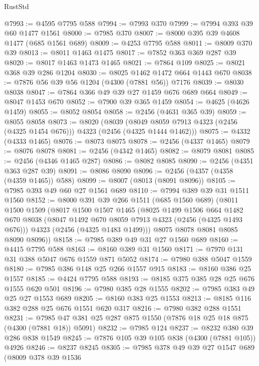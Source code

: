 \begin{lexlean}{RustStd}
\begin{coremodule}
@7993 := @4595 @7795 @588
@7994 := @7993 @370
@7999 := @7994 @393 @39 @60 @1477 @1561
@8000 := @7985 @370
@8007 := @8000 @395 @39 @4608 @1477 (@685 @1561 @689)
@8009 := @4253 @7795 @588
@8011 := @8009 @370 @39
@8013 := @8011 @1463 @1475
@8017 := @7852 @363 @369 @287 @39
@8020 := @8017 @1463 @1473 @1465
@8021 := @7864 @109
@8025 := @8021 @368 @39 @286 @1204
@8030 := @8025 @1462 @1472 @664 @1443 @670
@8038 := @7876 @56 @39 @56 @1204 (@4300 (@7881 @56)) @7176
@8039 := @8030 @8038
@8047 := @7864 @366 @49 @39 @27 @1459 @676 @689 @664
@8049 := @8047 @1453 @670
@8052 := @7900 @39 @365 @1459
@8054 := @4625 (@4626 @1459)
@8055 := @8052 @8054
@8058 := @2456 (@4631 @365 @39)
@8059 := @8055 @8058
@8073 := @8020
    (@8039 (@8049 @8059 @7913 @4323 (@2456 (@4325 @1454 @676))) @4323 (@2456 (@4325 @1444 @1462)))
@8075 := @4332 (@4333 @1465)
@8076 := @8073 @8075
@8078 := @2456 (@4337 @1465)
@8079 := @8076 @8078
@8081 := @2456 (@4342 @1465)
@8082 := @8079 @8081
@8085 := @2456 (@4346 @1465 @287)
@8086 := @8082 @8085
@8090 := @2456 (@4351 @363 @287 @39)
@8091 := @8086 @8090
@8096 := @2456 (@4357 (@4358 (@4359 @1465)) @588)
@8099 := @8007 (@8013 (@8091 @8096))
@8105 := @7985 @393 @49 @60 @27 @1561 @689
@8110 := @7994 @389 @39 @31 @1511 @1560
@8152 := @8000
    @391
    @39
    @266
    @1511
    (@685 @1560 @689)
    (@8011
      @1500
      @1509
      (@8017
        @1500
        @1507
        @1465
        (@8025
          @1499
          @1506
          @664
          @1482
          @670
          @8038
          (@8047 @1492 @670 @8059 @7913 @4323 (@2456 (@4325 @1493 @676)))
          @4323
          (@2456 (@4325 @1483 @1499)))
        @8075
        @8078
        @8081
        @8085
        @8090
        @8096))
@8158 := @7985 @389 @49 @31 @27 @1560 @689
@8160 := @4415 @7795 @588
@8163 := @8160 @389 @31 @1560
@8171 := @7970 @131 @31 @388 @5047 @676 @1559 @871 @5052
@8174 := @7980 @388 @5047 @1559
@8180 := @7985 @386 @148 @25 @266 @1557 @915
@8183 := @8160 @386 @25 @1557
@8185 := @4424 @7795 @588
@8193 := @8185 @375 @385 @28 @25 @676 @1555 @620 @501
@8196 := @7980 @385 @28 @1555
@8202 := @7985 @383 @49 @25 @27 @1553 @689
@8205 := @8160 @383 @25 @1553
@8213 := @8185 @116 @382 @288 @25 @676 @1551 @620 @317
@8216 := @7980 @382 @288 @1551
@8231 := @7985 @47 @381 @25 @287 @875 @1550 (@7876 @18 @25 @18 @875 (@4300 (@7881 @18)) @5091)
@8232 := @7985 @124
@8237 := @8232 @380 @39 @286 @838 @1549
@8245 := @7876 @105 @39 @105 @838 (@4300 (@7881 @105)) @4926
@8246 := @8237 @8245
@8305 := @7985
    @378
    @49
    @39
    @27
    @1547
    @689
    (@8009
      @378
      @39
      @1536

\end{coremodule}
\end{lexlean}
